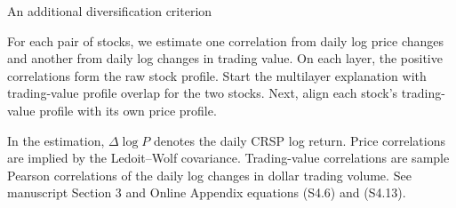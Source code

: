 \documentclass[9pt,aspectratio=169,t]{beamer}
\begin{document}
\begin{frame}{An additional diversification criterion}
{\par\smallskip
For each pair of stocks, we estimate one correlation from daily log price changes and another from daily log changes in trading value. On each layer, the positive correlations form the raw stock profile. Start the multilayer explanation with trading-value profile overlap for the two stocks. Next, align each stock's trading-value profile with its own price profile.
\par\smallskip
In the estimation, \(\Delta\log P\) denotes the daily CRSP log return. Price correlations are implied by the Ledoit--Wolf covariance. Trading-value correlations are sample Pearson correlations of the daily log changes in dollar trading volume. See manuscript Section 3 and Online Appendix equations (S4.6) and (S4.13).}
\end{frame}
\end{document}
